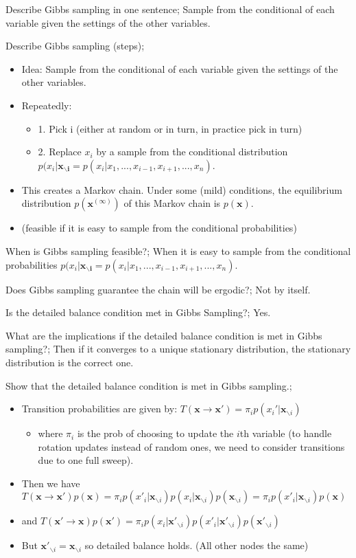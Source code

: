 \documentclass{article}
\begin{document}
Describe Gibbs sampling in one sentence; Sample from the conditional of each variable given the settings of the other variables.

Describe Gibbs sampling (steps); \begin{itemize} \item Idea: Sample from the conditional of each variable given the settings of the other variables. \item Repeatedly: \begin{itemize} \item 1. Pick i (either at random or in turn, in practice pick in turn) \item 2. Replace $x_i$ by a sample from the conditional distribution $p(x_i|\mathbf{x_{\backslash i}} = p(x_i | x_1, ..., x_{i-1}, x_{i+1}, ..., x_n)$. \end{itemize} \item This creates a Markov chain. Under some (mild) conditions, the equilibrium distribution $p(\mathbf{x}^(\infty))$ of this Markov chain is $p(\mathbf{x})$. \item (feasible if it is easy to sample from the conditional probabilities) \end{itemize} 

When is Gibbs sampling feasible?; When it is easy to sample from the conditional probabilities $p(x_i|\mathbf{x_{\backslash i}} = p(x_i | x_1, ..., x_{i-1}, x_{i+1}, ..., x_n)$.

Does Gibbs sampling guarantee the chain will be ergodic?; Not by itself.

Is the detailed balance condition met in Gibbs Sampling?; Yes.

What are the implications if the detailed balance condition is met in Gibbs sampling?; Then if it converges to a unique stationary distribution, the stationary distribution is the correct one.

Show that the detailed balance condition is met in Gibbs sampling.; \begin{itemize} \item Transition probabilities are given by: $T(\mathbf{x}\rightarrow \mathbf{x'}) = \pi_i p(x_i'|\mathbf{x}_{\backslash i})$ \begin{itemize} \item where $\pi_i$ is the prob of choosing to update the $i$th variable (to handle rotation updates instead of random ones, we need to consider transitions due to one full sweep). \end{itemize} \item Then we have $T(\mathbf{x\rightarrow x'})p(\mathbf{x}) = \pi_i p(x'_i|\mathbf{x}_{\backslash i})p(x_i|\mathbf{x}_{\backslash i})p(\mathbf{x}_{\backslash i}) = \pi_i p(x'_i|\mathbf{x}_{\backslash i}) p(\mathbf{x})$ \item and $T(\mathbf{x'\rightarrow x})p(\mathbf{x'}) = \pi_i p(x_i|\mathbf{x}'_{\backslash i})p(x'_i|\mathbf{x}'_{\backslash i})p(\mathbf{x}'_{\backslash i})$ \item But $\mathbf{x}'_{\backslash i} = \mathbf{x}_{\backslash i}$ so detailed balance holds. (All other nodes the same) \end{itemize}
\end{document}
